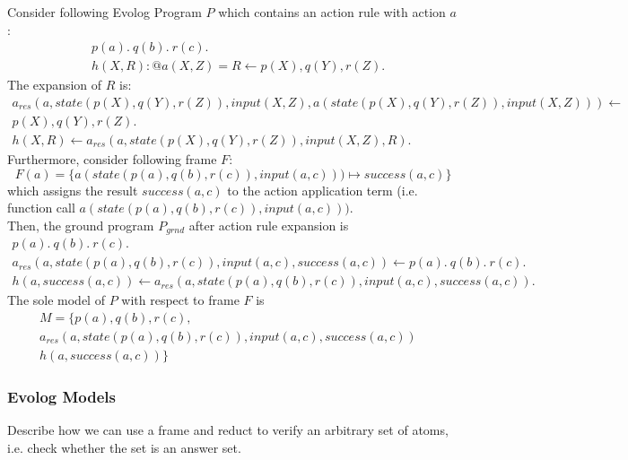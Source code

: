\begin{example}
\label{ex:action-rule-expansion}
Consider following Evolog Program $P$ which contains an action rule with action $a$:
\begin{align*}
	&p(a).~q(b).~r(c). \\
	&h(X, R) : @a(X, Z) = R \leftarrow p(X), q(Y), r(Z).
\end{align*}
The expansion of $R$ is:
\begin{align*}
	a_{res}(a, \mathit{state}(p(X), q(Y), r(Z)), \mathit{input}(X, Z), a(\mathit{state}(p(X), q(Y), r(Z)), \mathit{input}(X, Z))) \leftarrow& \\
	p(X), q(Y), r(Z).& \\
	h(X, R) \leftarrow a_{res}(a, \mathit{state}(p(X), q(Y), r(Z)), \mathit{input}(X, Z), R).&
\end{align*}
Furthermore, consider following frame $F$:
\[
	F(a) = \{a(\mathit{state}(p(a), q(b), r(c)), \mathit{input}(a, c))) \mapsto \mathit{success}(a, c)\}
\]
which assigns the result $\mathit{success}(a, c)$ to the action application term (i.e. function call $a(\mathit{state}(p(a), q(b), r(c)), \mathit{input}(a, c)))$. \\

Then, the ground program $P_{grnd}$ after action rule expansion is
\begin{align*}
	p(a).~q(b).~r(c).& \\
	a_{res}(a, \mathit{state}(p(a), q(b), r(c)), \mathit{input}(a, c), \mathit{success}(a, c)) \leftarrow p(a).~q(b).~r(c).& \\
	h(a, \mathit{success}(a, c)) \leftarrow a_{res}(a, \mathit{state}(p(a), q(b), r(c)), \mathit{input}(a, c), \mathit{success}(a, c)).&
\end{align*}
The sole model of $P$ with respect to frame $F$ is 
\begin{align*}
	M = \{p(a), q(b), r(c),& \\
	a_{res}(a, \mathit{state}(p(a), q(b), r(c)), \mathit{input}(a, c), \mathit{success}(a, c))& \\ h(a, \mathit{success}(a, c))\}&
\end{align*}
\end{example}

\subsubsection{Evolog Models}
\label{subsubsec:evolog-action-semantics-models}

Describe how we can use a frame and reduct to verify an arbitrary set of atoms, i.e. check whether the set is an answer set.
